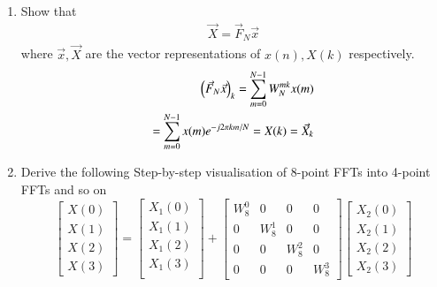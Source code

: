 \documentclass[journal,12pt,twocolumn]{IEEEtran}
\renewcommand\thesection{\arabic{section}}
\begin{document}
\begin{enumerate}[label=\thesection.\arabic*
	,ref=\thesection.\theenumi]
\begin{enumerate}[label=\arabic*.,ref=\thesection.\theenumi]
\begin{equation}
		\vec{P_4} = \myvec{\vec{e_4}^{1} & \vec{e_4}^{3} & \vec{e_4}^{2} & \vec{e_4}^{4}}
	\end{equation}
	From \eqref{def:xn}
	\begin{equation}
		\vec{x} = \cbrak{1,2,3,4}
	\end{equation}
	\begin{equation}
		\vec{P}_{4}\vec{x} = \brak{1,3,2,4}
	\end{equation}
	\item Show that 
	\begin{align}
		\vec{X} = \vec{F}_N \vec{x}
		\label{eq:dft-mat-def}
	\end{align}
	where $\vec{x}, \vec{X}$ are the vector representations of $x(n), X(k)$ respectively.\\
	\solution
	\begin{align}
		\left(\vec{F}_{N}\vec{x}\right)_{k} = \sum_{m=0}^{N-1}W_{N}^{mk}x(m)\\
		= \sum_{m=0}^{N-1} x(m) e^{-j 2 \pi k m / N}
		= X(k) = \vec{X}_{k} 
	\end{align}
	\item Derive the following Step-by-step visualisation  of
	8-point FFTs into 4-point FFTs and so on
	\begin{equation}
		\begin{bmatrix}
			X(0) \\ 
			X(1) \\ 
			X(2) \\ 
			X(3)
		\end{bmatrix}
		=
		\begin{bmatrix}
			X_{1}(0) \\ 
			X_{1}(1)\\ 
			X_{1}(2)\\
			X_{1}(3)\\
		\end{bmatrix}
		+
		\begin{bmatrix}
			W^{0}_{8} & 0 & 0 & 0\\
			0 & W^{1}_{8} & 0 & 0\\
			0 & 0 & W^{2}_{8} & 0\\
			0 & 0 & 0 & W^{3}_{8}
		\end{bmatrix}
		\begin{bmatrix}
			X_{2}(0) \\ 
			X_{2}(1) \\ 
			X_{2}(2) \\
			X_{2}(3)
		\end{bmatrix}
	\end{equation}

\end{enumerate}
\end{enumerate}
\end{document}
